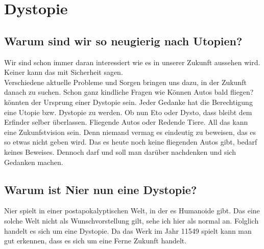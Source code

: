 %
%
%
%
\newpage
\chapter{Dystopie}


\section{Warum sind wir so neugierig nach Utopien?}
Wir sind schon immer daran interessiert wie es in unserer Zukunft aussehen wird. Keiner kann das mit Sicherheit sagen. \\
Verschiedene aktuelle Probleme und Sorgen bringen uns dazu, in der Zukunft danach zu suchen. Schon ganz kindliche Fragen wie \dq Können Autos bald fliegen? \dq könnten der Ursprung einer Dystopie sein. Jeder Gedanke hat die Berechtigung eine Utopie bzw. Dystopie zu werden. Ob nun Eto oder Dysto, dass bleibt dem Erfinder selber überlassen. Fliegende Autos oder Redende Tiere. All das kann eine Zukunfstvision sein. Denn niemand vermag es eindeutig zu beweisen, das es so etwas nicht geben wird. Das es heute noch keine fliegenden Autos gibt, bedarf keines Beweises. Dennoch darf und soll man darüber nachdenken und sich Gedanken machen. ~\cite{dysto}


\section{Warum ist Nier nun eine Dystopie?}
Nier spielt in einer postapokalyptischen Welt, in der es Humanoide gibt. Das eine solche Welt nicht als Wunschvorstellung gilt, sehe ich hier als normal an. Folglich handelt es sich um eine Dystopie. Da das Werk im Jahr 11549 spielt kann man gut erkennen, dass es sich um eine Ferne Zukunft handelt.


